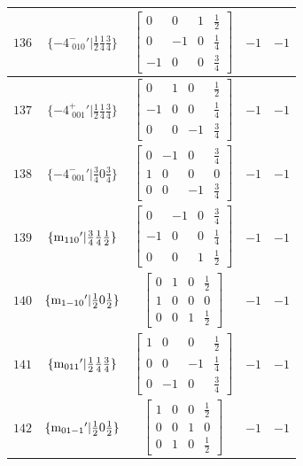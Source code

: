 \documentclass[fleqn,8pt]{jsarticle}
\begin{document}
\begin{longtable}{ccccc}
$ 136 $ & $ \{-4^{-}_{\,\,010}{}'|\frac{1}{2} \frac{1}{4} \frac{3}{4}\} $ & $ \begin{bmatrix} 0 & 0 & 1 & \frac{1}{2} \\ 0 & -1 & 0 & \frac{1}{4} \\ -1 & 0 & 0 & \frac{3}{4} \end{bmatrix} $ & $ -1 $ & $ -1 $ \\ \hline
$ 137 $ & $ \{-4^{+}_{\,\,001}{}'|\frac{1}{2} \frac{1}{4} \frac{3}{4}\} $ & $ \begin{bmatrix} 0 & 1 & 0 & \frac{1}{2} \\ -1 & 0 & 0 & \frac{1}{4} \\ 0 & 0 & -1 & \frac{3}{4} \end{bmatrix} $ & $ -1 $ & $ -1 $ \\ \hline
$ 138 $ & $ \{-4^{-}_{\,\,001}{}'|\frac{3}{4} 0 \frac{3}{4}\} $ & $ \begin{bmatrix} 0 & -1 & 0 & \frac{3}{4} \\ 1 & 0 & 0 & 0 \\ 0 & 0 & -1 & \frac{3}{4} \end{bmatrix} $ & $ -1 $ & $ -1 $ \\ \hline
$ 139 $ & $ \{{\rm m}_{110}{}'|\frac{3}{4} \frac{1}{4} \frac{1}{2}\} $ & $ \begin{bmatrix} 0 & -1 & 0 & \frac{3}{4} \\ -1 & 0 & 0 & \frac{1}{4} \\ 0 & 0 & 1 & \frac{1}{2} \end{bmatrix} $ & $ -1 $ & $ -1 $ \\ \hline
$ 140 $ & $ \{{\rm m}_{1-10}{}'|\frac{1}{2} 0 \frac{1}{2}\} $ & $ \begin{bmatrix} 0 & 1 & 0 & \frac{1}{2} \\ 1 & 0 & 0 & 0 \\ 0 & 0 & 1 & \frac{1}{2} \end{bmatrix} $ & $ -1 $ & $ -1 $ \\ \hline
$ 141 $ & $ \{{\rm m}_{011}{}'|\frac{1}{2} \frac{1}{4} \frac{3}{4}\} $ & $ \begin{bmatrix} 1 & 0 & 0 & \frac{1}{2} \\ 0 & 0 & -1 & \frac{1}{4} \\ 0 & -1 & 0 & \frac{3}{4} \end{bmatrix} $ & $ -1 $ & $ -1 $ \\ \hline
$ 142 $ & $ \{{\rm m}_{01-1}{}'|\frac{1}{2} 0 \frac{1}{2}\} $ & $ \begin{bmatrix} 1 & 0 & 0 & \frac{1}{2} \\ 0 & 0 & 1 & 0 \\ 0 & 1 & 0 & \frac{1}{2} \end{bmatrix} $ & $ -1 $ & $ -1 $ \\ \hline

\end{longtable}
\end{document}
